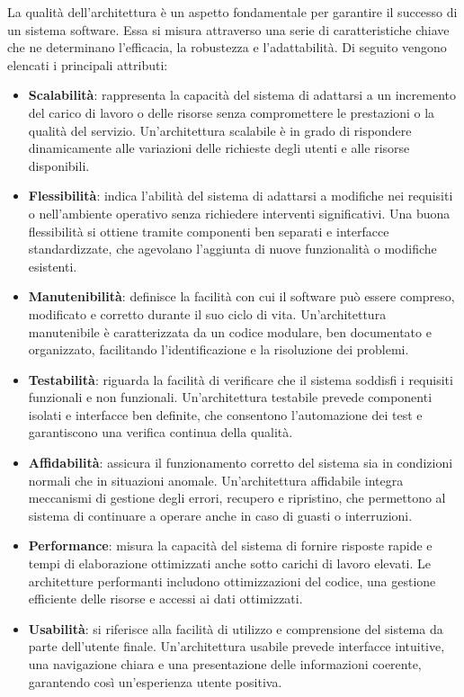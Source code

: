 La qualità dell'architettura è un aspetto fondamentale per garantire il successo di un sistema software. Essa si misura attraverso una serie di caratteristiche chiave che ne determinano l'efficacia, la robustezza e l'adattabilità. Di seguito vengono elencati i principali attributi:
\begin{itemize}
    \item \textbf{Scalabilità}: rappresenta la capacità del sistema di adattarsi a un incremento del carico di lavoro o delle risorse senza compromettere le prestazioni o la qualità del servizio. Un'architettura scalabile è in grado di rispondere dinamicamente alle variazioni delle richieste degli utenti e alle risorse disponibili.
    \item \textbf{Flessibilità}: indica l'abilità del sistema di adattarsi a modifiche nei requisiti o nell'ambiente operativo senza richiedere interventi significativi. Una buona flessibilità si ottiene tramite componenti ben separati e interfacce standardizzate, che agevolano l'aggiunta di nuove funzionalità o modifiche esistenti.
    \item \textbf{Manutenibilità}: definisce la facilità con cui il software può essere compreso, modificato e corretto durante il suo ciclo di vita. Un'architettura manutenibile è caratterizzata da un codice modulare, ben documentato e organizzato, facilitando l'identificazione e la risoluzione dei problemi.
    \item \textbf{Testabilità}: riguarda la facilità di verificare che il sistema soddisfi i requisiti funzionali e non funzionali. Un'architettura testabile prevede componenti isolati e interfacce ben definite, che consentono l'automazione dei test e garantiscono una verifica continua della qualità.
    \item \textbf{Affidabilità}: assicura il funzionamento corretto del sistema sia in condizioni normali che in situazioni anomale. Un'architettura affidabile integra meccanismi di gestione degli errori, recupero e ripristino, che permettono al sistema di continuare a operare anche in caso di guasti o interruzioni.
    \item \textbf{Performance}: misura la capacità del sistema di fornire risposte rapide e tempi di elaborazione ottimizzati anche sotto carichi di lavoro elevati. Le architetture performanti includono ottimizzazioni del codice, una gestione efficiente delle risorse e accessi ai dati ottimizzati.
    \item \textbf{Usabilità}: si riferisce alla facilità di utilizzo e comprensione del sistema da parte dell'utente finale. Un'architettura usabile prevede interfacce intuitive, una navigazione chiara e una presentazione delle informazioni coerente, garantendo così un'esperienza utente positiva.

\end{itemize}
